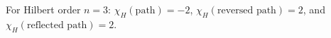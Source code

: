 \noindent For Hilbert order $n=3$: $\chi_H(\text{path})=-2$, $\chi_H(\text{reversed path})=2$, and $\chi_H(\text{reflected path})=2$.
